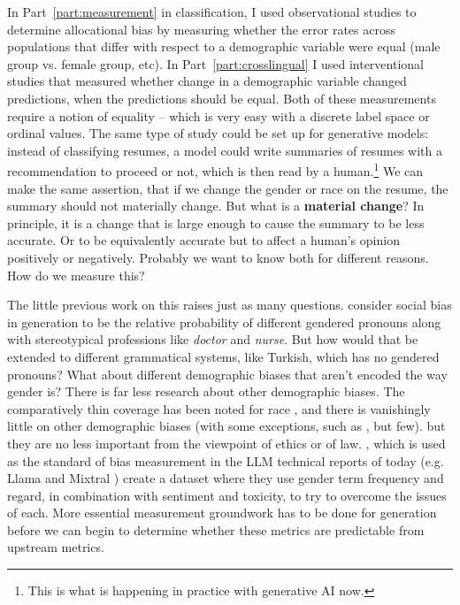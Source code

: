 In Part~\ref{part:measurement} in classification, I used observational studies to determine allocational bias by measuring whether the error rates across populations that differ with respect to a demographic variable were equal (male group vs. female group, etc). In Part~\ref{part:crosslingual} I used interventional studies that measured whether change in a demographic variable changed predictions, when the predictions should be equal. Both of these measurements require a notion of equality -- which is very easy with a discrete label space or ordinal values. The same type of study could be set up for generative models: instead of classifying resumes, a model could write summaries of resumes with a recommendation to proceed or not, which is then read by a human.\footnote{This is what is happening in practice with generative AI now.} We can make the same assertion, that if we change the gender or race on the resume, the summary should not materially change. But what is a \textbf{material change}? In principle, it is a change that is large enough to cause the summary to be less accurate. Or to be equivalently accurate but to affect a human's opinion positively or negatively. Probably we want to know both for different reasons. How do we measure this? 

The little previous work on this raises just as many questions. \citet{vig_causal} consider social bias in generation to be the relative probability of different gendered pronouns along with stereotypical professions like \textit{doctor} and \textit{nurse}. But how would that be extended to different grammatical systems, like Turkish, which has no gendered pronouns? What about different demographic biases that aren't encoded the way gender is? There is far less research about other demographic biases. The comparatively thin coverage has been noted for race \citep{field-etal-2021-survey}, and there is vanishingly little on other demographic biases (with some exceptions, such as \citet{hutchinson-etal-2020-social}, but few).  but they are no less important from the viewpoint of ethics or of law. 
\citet{BOLD}, which is used as the standard of bias measurement in the LLM technical reports of today (e.g. Llama and Mixtral \citep{llama2,jiang2024mixtral}) create a dataset where they use gender term frequency and regard, in combination with sentiment and toxicity, to try to overcome the issues of each. 
More essential measurement groundwork has to be done for generation before we can begin to determine whether these metrics are predictable from upstream metrics.

